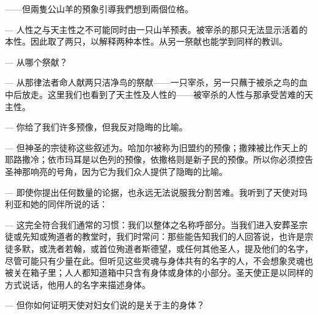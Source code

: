 ——但兩隻公山羊的預象引導我們想到兩個位格。\par

— 人性之与天主性之不可能同时由一只山羊预表。被宰杀的那只无法显示活着的本性。因此取了两只，以解释两种本性。从另一祭献也能学到同样的教训。\par

— 从哪个祭献？\par

— 从那律法者命人献两只洁净鸟的祭献——一只宰杀，另一只蘸于被杀之鸟的血中后放走。这里我们也看到了天主性及人性的——被宰杀的人性与那承受苦难的天主性。\par

— 你给了我们许多预像，但我反对隐晦的比喻。\par

— 但神圣的宗徒称这些叙述为。哈加尔被称为旧盟约的预像；撒辣被比作天上的耶路撒冷；依市玛耳是以色列的预像，依撒格则是新子民的预像。所以你必须控告圣神那响亮的号角，因为它为我们众人提供了隐晦的比喻。\par

— 即使你提出任何数量的论据，也永远无法说服我分割苦难。我听到了天使对玛利亚和她的同伴所说的话：\par

— 这完全符合我们通常的习惯：我们以整体之名称呼部分。当我们进入安葬圣宗徒或先知或殉道者的教堂时，我们时常问：那些能告知我们的人回答说，也许是宗徒多默，或洗者若翰，或首位殉道者斯德望，或任何其他圣人，提及他们的名字，尽管可能只有少量在此。但听见这些灵魂与身体共有的名字的人，不会想象灵魂也被关在箱子里；人人都知道箱中只含有身体或身体的小部分。圣天使正是以同样的方式说话，他用人的名字来描述身体。\par

— 但你如何证明天使对妇女们说的是关于主的身体？\par

